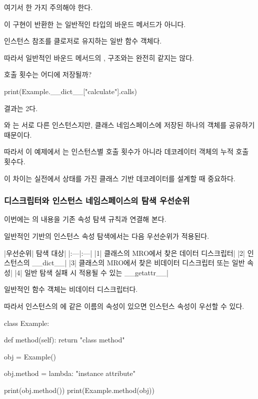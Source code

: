 여기서 한 가지 주의해야 한다.

이 구현이 반환한 는 일반적인  타입의 바운드 메서드가 아니다.

인스턴스 참조를 클로저로 유지하는 일반 함수 객체다.

따라서 일반적인 바운드 메서드의 ,  구조와는 완전히 같지는 않다.

\begin{dhknote}
\begin{dhksmry}[centered]
호출 횟수는 어디에 저장될까?
\end{dhksmry}
\end{dhknote}

\begin{dhkcode}
print(Example.__dict__["calculate"].calls)
\end{dhkcode}

결과는 2다.

와 는 서로 다른 인스턴스지만, 클래스 네임스페이스에 저장된 하나의  객체를 공유하기 때문이다.

따라서 이 예제에서 는 인스턴스별 호출 횟수가 아니라 데코레이터 객체의 누적 호출 횟수다.

이 차이는 실전에서 상태를 가진 클래스 기반 데코레이터를 설계할 때 중요하다.

\subsubsection{디스크립터와 인스턴스 네임스페이스의 탐색 우선순위}

이번에는 의 내용을 기존 속성 탐색 규칙과 연결해 본다.

일반적인  기반의 인스턴스 속성 탐색에서는 다음 우선순위가 적용된다.

\begin{dhktable}
|우선순위|	탐색 대상|
|:---|:---|
|1|	클래스의 MRO에서 찾은 데이터 디스크립터|
|2|	인스턴스의 __dict__|
|3|	클래스의 MRO에서 찾은 비데이터 디스크립터 또는 일반 속성|
|4|	일반 탐색 실패 시 적용될 수 있는 __getattr__|
\end{dhktable}

일반적인 함수 객체는 비데이터 디스크립터다.

따라서 인스턴스의 에 같은 이름의 속성이 있으면 인스턴스 속성이 우선할 수 있다.

\begin{dhkcode}
class Example:

    def method(self):
        return "class method"


obj = Example()

obj.method = lambda: "instance attribute"

print(obj.method())
print(Example.method(obj))
\end{dhkcode}

